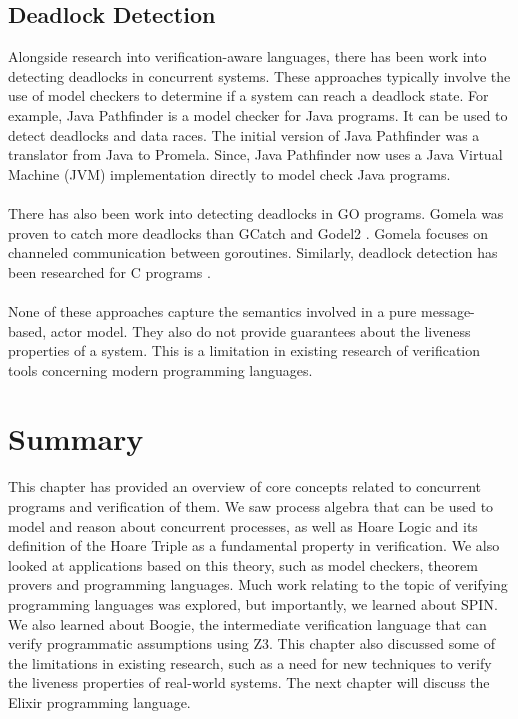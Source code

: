 \subsection{Deadlock Detection}
Alongside research into verification-aware languages, there has been work into detecting deadlocks in concurrent systems. These approaches typically involve the use of model checkers to determine if a system can reach a deadlock state. For example, Java Pathfinder \cite{jpf} is a model checker for Java programs. It can be used to detect deadlocks and data races. The initial version of Java Pathfinder was a translator from Java to Promela. Since, Java Pathfinder now uses a Java Virtual Machine (JVM) implementation directly to model check Java programs.
\\ \\
There has also been work into detecting deadlocks in GO programs. Gomela \cite{gomela} was proven to catch more deadlocks than GCatch \cite{gcatch} and Godel2 \cite{godel2}. Gomela focuses on channeled communication between goroutines. Similarly, deadlock detection has been researched for C programs \cite{c_to_promela}. 
\\ \\
None of these approaches capture the semantics involved in a pure message-based, actor model. They also do not provide guarantees about the liveness properties of a system. This is a limitation in existing research of verification tools concerning modern programming languages.
\section{Summary}
This chapter has provided an overview of core concepts related to concurrent programs and verification of them. We saw process algebra that can be used to model and reason about concurrent processes, as well as Hoare Logic and its definition of the Hoare Triple as a fundamental property in verification. We also looked at applications based on this theory, such as model checkers, theorem provers and programming languages. Much work relating to the topic of verifying programming languages was explored, but importantly, we learned about SPIN. We also learned about Boogie, the intermediate verification language that can verify programmatic assumptions using Z3. This chapter also discussed some of the limitations in existing research, such as a need for new techniques to verify the liveness properties of real-world systems. The next chapter will discuss the Elixir programming language.

